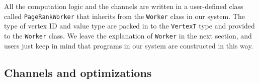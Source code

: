 \documentclass{sokendai_thesis} %
\begin{document}

All the computation logic and the channels are written in a user-defined class called \texttt{PageRankWorker} that inherits from the \texttt{Worker} class in our system.
The type of vertex ID and value type are packed in to the \texttt{VertexT} type and provided to the \texttt{Worker} class.
We leave the explanation of \texttt{Worker} in the next section, and users just keep in mind that programs in our system are constructed in this way.

\subsection{Channels and optimizations}
\end{document}
